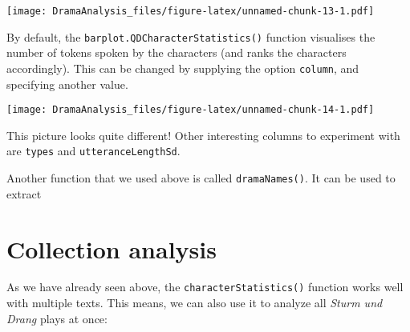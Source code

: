 \documentclass[]{book}
\newenvironment{Shaded}{\begin{snugshade}}{\end{snugshade}}
\newcommand{\CommentTok}[1]{\textcolor[rgb]{0.56,0.35,0.01}{\textit{#1}}}
\newcommand{\DataTypeTok}[1]{\textcolor[rgb]{0.13,0.29,0.53}{#1}}
\newcommand{\KeywordTok}[1]{\textcolor[rgb]{0.13,0.29,0.53}{\textbf{#1}}}
\newcommand{\NormalTok}[1]{#1}
\newcommand{\OperatorTok}[1]{\textcolor[rgb]{0.81,0.36,0.00}{\textbf{#1}}}
\newcommand{\OtherTok}[1]{\textcolor[rgb]{0.56,0.35,0.01}{#1}}
\newcommand{\StringTok}[1]{\textcolor[rgb]{0.31,0.60,0.02}{#1}}
\begin{document}
\begin{Shaded}
\end{Shaded}

\texttt{[image: DramaAnalysis\_files/figure-latex/unnamed-chunk-13-1.pdf]}

By default, the \texttt{barplot.QDCharacterStatistics()} function visualises the number of tokens spoken by the characters (and ranks the characters accordingly). This can be changed by supplying the option \texttt{column}, and specifying another value.

\begin{Shaded}
\end{Shaded}

\texttt{[image: DramaAnalysis\_files/figure-latex/unnamed-chunk-14-1.pdf]}

This picture looks quite different! Other interesting columns to experiment with are \texttt{types} and \texttt{utteranceLengthSd}.

Another function that we used above is called \texttt{dramaNames()}. It can be used to extract

\hypertarget{collection-analysis}{%
\section{Collection analysis}\label{collection-analysis}}

As we have already seen above, the \texttt{characterStatistics()} function works well with multiple texts. This means, we can also use it to analyze all \emph{Sturm und Drang} plays at once:
\end{document}
